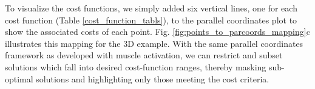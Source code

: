 To visualize the cost functions, we simply added six vertical lines, one for each cost function (Table \ref{cost_function_tabls}), to the parallel coordinates plot to show the associated costs of each point. Fig. \ref{fig:points_to_parcoords_mapping}c illustrates this mapping for the 3D example.
With the same parallel coordinates framework as developed with muscle activation, we can restrict and subset solutions which fall into desired cost-function ranges, thereby masking sub-optimal solutions and highlighting only those meeting the cost criteria.



